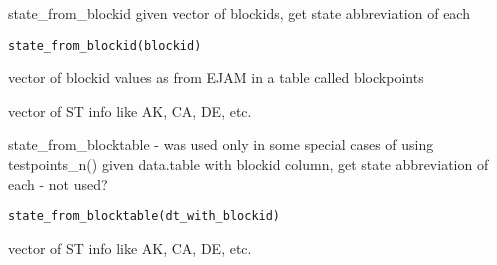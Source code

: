 \documentclass[a4paper]{book}
\begin{document}
%
\begin{Description}\relax
state\_from\_blockid
given vector of blockids, get state abbreviation of each
\end{Description}
%
\begin{Usage}
\begin{verbatim}
state_from_blockid(blockid)
\end{verbatim}
\end{Usage}
%
\begin{Arguments}
\begin{ldescription}
\item[\code{blockid}] vector of blockid values as from EJAM in a table called blockpoints
\end{ldescription}
\end{Arguments}
%
\begin{Value}
vector of ST info like AK, CA, DE, etc.
\end{Value}
%
\begin{Examples}
\end{Examples}
%
\begin{Description}\relax
state\_from\_blocktable - was used only in some special cases of using testpoints\_n()
given data.table with blockid column, get state abbreviation of each - not used?
\end{Description}
%
\begin{Usage}
\begin{verbatim}
state_from_blocktable(dt_with_blockid)
\end{verbatim}
\end{Usage}
%
\begin{Arguments}
\begin{ldescription}
\item[\code{dt\_with\_blockid}] 
\end{ldescription}
\end{Arguments}
%
\begin{Value}
vector of ST info like AK, CA, DE, etc.
\end{Value}
\end{document}
